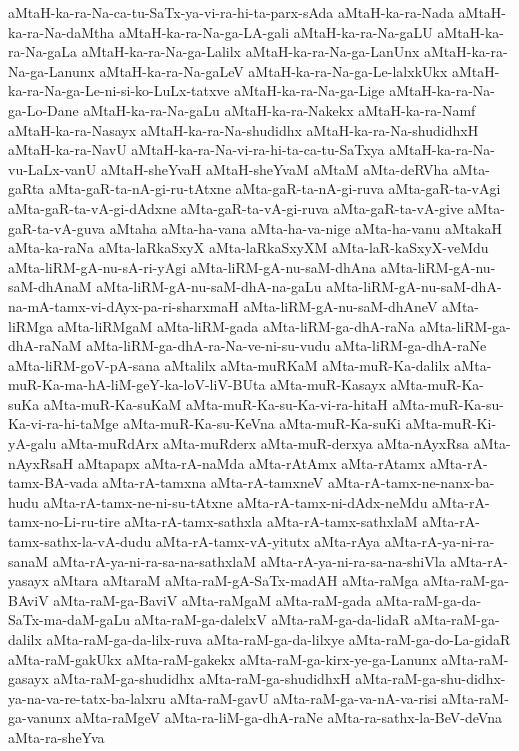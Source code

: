 {aMtaH-ka-ra-Na-ca-tu-SaTx-ya-vi-ra-hi-ta-parx-sAda
aMtaH-ka-ra-Nada
aMtaH-ka-ra-Na-daMtha
aMtaH-ka-ra-Na-ga-LA-gali
aMtaH-ka-ra-Na-gaLU
aMtaH-ka-ra-Na-gaLa
aMtaH-ka-ra-Na-ga-Lalilx
aMtaH-ka-ra-Na-ga-LanUnx
aMtaH-ka-ra-Na-ga-Lanunx
aMtaH-ka-ra-Na-gaLeV
aMtaH-ka-ra-Na-ga-Le-lalxkUkx
aMtaH-ka-ra-Na-ga-Le-ni-si-ko-LuLx-tatxve
aMtaH-ka-ra-Na-ga-Lige
aMtaH-ka-ra-Na-ga-Lo-Dane
aMtaH-ka-ra-Na-gaLu
aMtaH-ka-ra-Nakekx
aMtaH-ka-ra-Namf
aMtaH-ka-ra-Nasayx
aMtaH-ka-ra-Na-shudidhx
aMtaH-ka-ra-Na-shudidhxH
aMtaH-ka-ra-NavU
aMtaH-ka-ra-Na-vi-ra-hi-ta-ca-tu-SaTxya
aMtaH-ka-ra-Na-vu-LaLx-vanU
aMtaH-sheYvaH
aMtaH-sheYvaM
aMtaM
aMta-deRVha
aMta-gaRta
aMta-gaR-ta-nA-gi-ru-tAtxne
aMta-gaR-ta-nA-gi-ruva
aMta-gaR-ta-vAgi
aMta-gaR-ta-vA-gi-dAdxne
aMta-gaR-ta-vA-gi-ruva
aMta-gaR-ta-vA-give
aMta-gaR-ta-vA-guva
aMtaha
aMta-ha-vana
aMta-ha-va-nige
aMta-ha-vanu
aMtakaH
aMta-ka-raNa
aMta-laRkaSxyX
aMta-laRkaSxyXM
aMta-laR-kaSxyX-veMdu
aMta-liRM-gA-nu-sA-ri-yAgi
aMta-liRM-gA-nu-saM-dhAna
aMta-liRM-gA-nu-saM-dhAnaM
aMta-liRM-gA-nu-saM-dhA-na-gaLu
aMta-liRM-gA-nu-saM-dhA-na-mA-tamx-vi-dAyx-pa-ri-sharxmaH
aMta-liRM-gA-nu-saM-dhAneV
aMta-liRMga
aMta-liRMgaM
aMta-liRM-gada
aMta-liRM-ga-dhA-raNa
aMta-liRM-ga-dhA-raNaM
aMta-liRM-ga-dhA-ra-Na-ve-ni-su-vudu
aMta-liRM-ga-dhA-raNe
aMta-liRM-goV-pA-sana
aMtalilx
aMta-muRKaM
aMta-muR-Ka-dalilx
aMta-muR-Ka-ma-hA-liM-geY-ka-loV-liV-BUta
aMta-muR-Kasayx
aMta-muR-Ka-suKa
aMta-muR-Ka-suKaM
aMta-muR-Ka-su-Ka-vi-ra-hitaH
aMta-muR-Ka-su-Ka-vi-ra-hi-taMge
aMta-muR-Ka-su-KeVna
aMta-muR-Ka-suKi
aMta-muR-Ki-yA-galu
aMta-muRdArx
aMta-muRderx
aMta-muR-derxya
aMta-nAyxRsa
aMta-nAyxRsaH
aMtapapx
aMta-rA-naMda
aMta-rAtAmx
aMta-rAtamx
aMta-rA-tamx-BA-vada
aMta-rA-tamxna
aMta-rA-tamxneV
aMta-rA-tamx-ne-nanx-ba-hudu
aMta-rA-tamx-ne-ni-su-tAtxne
aMta-rA-tamx-ni-dAdx-neMdu
aMta-rA-tamx-no-Li-ru-tire
aMta-rA-tamx-sathxla
aMta-rA-tamx-sathxlaM
aMta-rA-tamx-sathx-la-vA-dudu
aMta-rA-tamx-vA-yitutx
aMta-rAya
aMta-rA-ya-ni-ra-sanaM
aMta-rA-ya-ni-ra-sa-na-sathxlaM
aMta-rA-ya-ni-ra-sa-na-shiVla
aMta-rA-yasayx
aMtara
aMtaraM
aMta-raM-gA-SaTx-madAH
aMta-raMga
aMta-raM-ga-BAviV
aMta-raM-ga-BaviV
aMta-raMgaM
aMta-raM-gada
aMta-raM-ga-da-SaTx-ma-daM-gaLu
aMta-raM-ga-dalelxV
aMta-raM-ga-da-lidaR
aMta-raM-ga-dalilx
aMta-raM-ga-da-lilx-ruva
aMta-raM-ga-da-lilxye
aMta-raM-ga-do-La-gidaR
aMta-raM-gakUkx
aMta-raM-gakekx
aMta-raM-ga-kirx-ye-ga-Lanunx
aMta-raM-gasayx
aMta-raM-ga-shudidhx
aMta-raM-ga-shudidhxH
aMta-raM-ga-shu-didhx-ya-na-va-re-tatx-ba-lalxru
aMta-raM-gavU
aMta-raM-ga-va-nA-va-risi
aMta-raM-ga-vanunx
aMta-raMgeV
aMta-ra-liM-ga-dhA-raNe
aMta-ra-sathx-la-BeV-deVna
aMta-ra-sheYva
}
